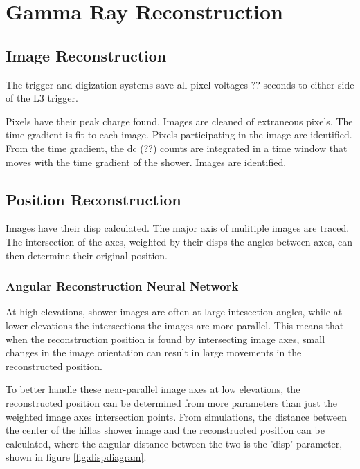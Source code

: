 \cleartooddpage[\thispagestyle{empty}]
\chapter{Gamma Ray Reconstruction}



\section{Image Reconstruction}\label{subsec:imgrecon}

The trigger and digization systems save all pixel voltages ?? seconds to either side of the L3 trigger.

Pixels have their peak charge found.
Images are cleaned of extraneous pixels.
The time gradient is fit to each image.
Pixels participating in the image are identified.
From the time gradient, the dc (??) counts are integrated in a time window that moves with the time gradient of the shower.
Images are identified.

\section{Position Reconstruction}\label{subsec:posrecon}
Images have their disp calculated.
The major axis of mulitiple images are traced.
The intersection of the axes, weighted by their disps the angles between axes, can then determine their original position.

\subsection{Angular Reconstruction Neural Network}
At high elevations, shower images are often at large intesection angles, while at lower elevations the intersections the images are more parallel.
This means that when the reconstruction position is found by intersecting image axes, small changes in the image orientation can result in large movements in the reconstructed position.

To better handle these near-parallel image axes at low elevations, the reconstructed position can be determined from more parameters than just the weighted image axes intersection points.
From simulations, the distance between the center of the hillas shower image and the reconstructed position can be calculated, where the angular distance between the two is the 'disp' parameter\cite{Senturk:2011}, shown in figure \ref{fig:dispdiagram}.

